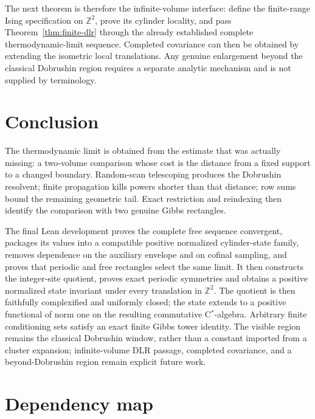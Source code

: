 \documentclass[11pt]{article}
\theoremstyle{definition}
\newcommand{\Z}{\mathbb Z}
\begin{document}
The next theorem is therefore the infinite-volume interface: define the
finite-range Ising specification on $\Z^2$, prove its cylinder locality, and
pass Theorem~\ref{thm:finite-dlr} through the already established complete
thermodynamic-limit sequence.  Completed covariance can then be obtained by
extending the isometric local translations.  Any genuine enlargement beyond
the classical Dobrushin region requires a separate analytic mechanism and is
not supplied by terminology.

\section{Conclusion}

The thermodynamic limit is obtained from the estimate that was actually
missing: a two-volume comparison whose cost is the distance from a fixed
support to a changed boundary.  Random-scan telescoping produces the
Dobrushin resolvent; finite propagation kills powers shorter than that
distance; row sums bound the remaining geometric tail.  Exact restriction and
reindexing then identify the comparison with two genuine Gibbs rectangles.

The final Lean development proves the complete free sequence convergent,
packages its values into a compatible positive normalized cylinder-state
family, removes dependence on the auxiliary envelope and on cofinal sampling,
and proves that periodic and free rectangles select the same limit.  It then
  constructs the integer-site quotient, proves exact periodic symmetries and
  obtains a positive normalized state invariant under every translation in
  $\Z^2$.  The quotient is then faithfully complexified and uniformly closed;
  the state extends to a positive functional of norm one on the resulting
  commutative C$^*$-algebra.  Arbitrary finite conditioning sets satisfy an
  exact finite Gibbs tower identity.  The visible region remains the classical
  Dobrushin window, rather than a constant imported from a cluster expansion;
  infinite-volume DLR passage, completed covariance, and a beyond-Dobrushin
  region remain explicit future work.

\appendix

\section{Dependency map}
\end{document}
